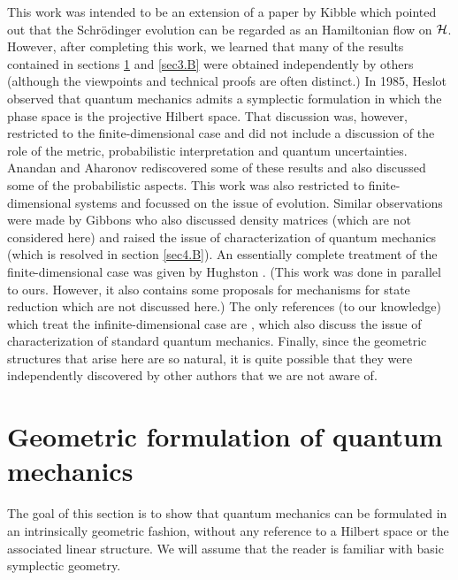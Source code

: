 \documentclass[12pt,aps,eqsecnum,tighten]{revtex4-2}
\def\H{{\cal H}}
\begin{document}
This work was intended to be an extension of a paper by Kibble
{}\cite{kibble} which pointed out that the Schr\"odinger evolution can
be regarded as an Hamiltonian flow on $\H$. However, after completing
this work, we learned that many of the results contained in sections
\ref{sec2} and \ref{sec3.B} were obtained independently by others
(although the viewpoints and technical proofs are often distinct.)  In
1985, Heslot \cite{heslot} observed that quantum mechanics admits a
symplectic formulation in which the phase space is the projective
Hilbert space. That discussion was, however, restricted to the
finite-dimensional case and did not include a discussion of the role
of the metric, probabilistic interpretation and quantum uncertainties.
Anandan and Aharonov \cite{anandan} rediscovered some of these results
and also discussed some of the probabilistic aspects. This work was
also restricted to finite-dimensional systems and focussed on the
issue of evolution. Similar observations were made by Gibbons
\cite{gibbons} who also discussed density matrices (which are not
considered here) and raised the issue of characterization of quantum
mechanics (which is resolved in section \ref{sec4.B}). An essentially
complete treatment of the finite-dimensional case was given by
Hughston \cite{hughston}. (This work was done in parallel to
ours. However, it also contains some proposals for mechanisms for
state reduction \cite{hughston2} which are not discussed here.)  The
only references (to our knowledge) which treat the
infinite-dimensional case are \cite{italy1,italy2}, which also discuss
the issue of characterization of standard quantum mechanics. Finally,
since the geometric structures that arise here are so natural, it is
quite possible that they were independently discovered by other
authors that we are not aware of.


\section{Geometric formulation of quantum mechanics}\label{sec2}

The goal of this section is to show that quantum mechanics can be
formulated in an intrinsically geometric fashion, without any
reference to a Hilbert space or the associated linear structure.  We
will assume that the reader is familiar with basic symplectic
geometry.

\end{document}

